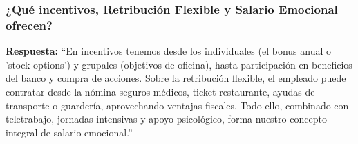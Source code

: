 \subsubsection*{¿Qué incentivos, Retribución Flexible y Salario Emocional ofrecen?}

\textbf{Respuesta:}\newline
``En incentivos tenemos desde los individuales (el bonus anual o 'stock options') y grupales (objetivos de oficina), hasta participación en beneficios del banco y compra de acciones. Sobre la retribución flexible, el empleado puede contratar desde la nómina seguros médicos, ticket restaurante, ayudas de transporte o guardería, aprovechando ventajas fiscales. Todo ello, combinado con teletrabajo, jornadas intensivas y apoyo psicológico, forma nuestro concepto integral de salario emocional.''

